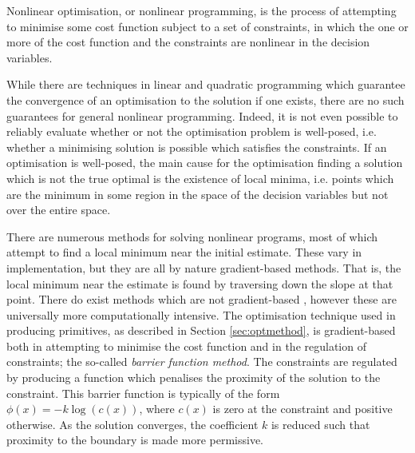Nonlinear optimisation, or nonlinear programming, is the process of attempting to minimise some cost function subject to a set of constraints, in which the one or more of the cost function and the constraints are nonlinear in the decision variables. 

While there are techniques in linear and quadratic programming which guarantee the convergence of an optimisation to the solution if one exists, there are no such guarantees for general nonlinear programming. Indeed, it is not even possible to reliably evaluate whether or not the optimisation problem is well-posed, i.e. whether a minimising solution is possible which satisfies the constraints. If an optimisation is well-posed, the main cause for the optimisation finding a solution which is not the true optimal is the existence of local minima, i.e. points which are the minimum in some region in the space of the decision variables but not over the entire space.

There are numerous methods for solving nonlinear programs, most of which attempt to find a local minimum near the initial estimate. These vary in implementation, but they are all by nature gradient-based methods. That is, the local minimum near the estimate is found by traversing down the slope at that point. There do exist methods which are not gradient-based \cite{perez2007particle, li2005multi}, however these are universally more computationally intensive. The optimisation technique used in producing primitives, as described in Section \ref{sec:optmethod}, is gradient-based both in attempting to minimise the cost function and in the regulation of constraints; the so-called \textit{barrier function method}. The constraints are regulated by producing a function which penalises the proximity of the solution to the constraint. This barrier function is typically of the form $\phi(x)=-k\log(c(x))$, where $c(x)$ is zero at the constraint and positive otherwise. As the solution converges, the coefficient $k$ is reduced such that proximity to the boundary is made more permissive.